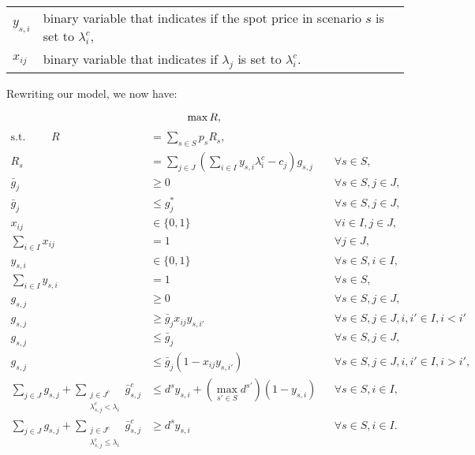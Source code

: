 \documentclass[12pt]{article}
\begin{document}
\begin{tabular}{ll}
$y_{s,i}$ & binary variable that indicates if the spot price in scenario $s$ is set to $\lambda^c_i$, \\
$x_{ij}$ & binary variable that indicates if $\lambda_j$ is set to $\lambda^c_i$.
\end{tabular}

Rewriting our model, we now have:

\begin{equation}
\max R, \\
\end{equation}
\begin{align}
\mbox{s.t. } \qquad R &= \sum_{s \in S} p_s R_s, \\
R_s &= \sum_{j \in J} \left(\sum_{i \in I} y_{s,i} \lambda^c_i - c_j\right) g_{s,j} & &\forall s \in S, \label{eqn:Rs} \\
\bar{g}_j &\ge 0 & &\forall s \in S, j \in J, \\
\bar{g}_j &\le g^*_j & &\forall s \in S, j \in J, \\
x_{ij} &\in \{0,1\} & &\forall i \in I, j \in J, \\
\sum_{i \in I} x_{ij} &= 1 & &\forall j \in J, \\
y_{s,i} &\in \{0,1\} & &\forall s \in S, i \in I, \\
\sum_{i \in I} y_{s,i} &= 1 & &\forall s \in S, \\
g_{s,j} &\ge 0 & &\forall s \in S, j \in J, \\
g_{s,j} &\ge \bar{g}_j x_{ij} y_{s,i'} & &\forall s \in S, j \in J, i, i' \in I, i < i' \label{eqn:big_gsj_ge} \\
g_{s,j} &\le \bar{g}_j & &\forall s \in S, j \in J, \\
g_{s,j} &\le \bar{g}_j \left( 1 - x_{ij} y_{s,i'} \right) & &\forall s \in S, j \in J, i, i' \in I, i > i', \label{eqn:big_gsj_le} \\
\sum_{j \in J} g_{s,j} + \sum_{\substack{j \in J^c \\ \lambda^c_{s,j} < \lambda_i}} \bar{g}^c_{s,j} &\le d^s y_{s,i} + \left(\max_{s' \in S} d^{s'} \right) (1 - y_{s,i}) & &\forall s \in S, i \in I, \\
\sum_{j \in J} g_{s,j} + \sum_{\substack{j \in J^c \\ \lambda^c_{s,j} \le \lambda_i}} \bar{g}^c_{s,j} &\ge d^s y_{s,i} & &\forall s \in S, i \in I.
\end{align}
\end{document}
